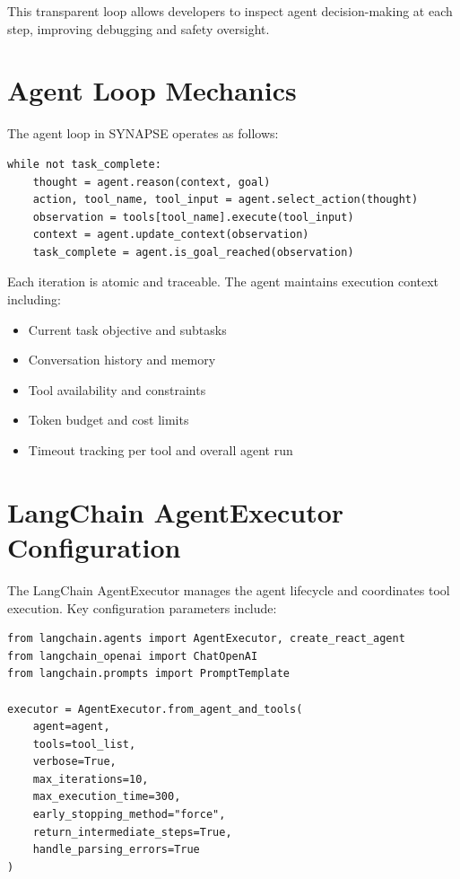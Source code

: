\documentclass{report}
\begin{document}
This transparent loop allows developers to inspect agent decision-making at each step, improving debugging and safety oversight.

\section{Agent Loop Mechanics}

The agent loop in SYNAPSE operates as follows:

\begin{lstlisting}
while not task_complete:
    thought = agent.reason(context, goal)
    action, tool_name, tool_input = agent.select_action(thought)
    observation = tools[tool_name].execute(tool_input)
    context = agent.update_context(observation)
    task_complete = agent.is_goal_reached(observation)
\end{lstlisting}

Each iteration is atomic and traceable. The agent maintains execution context including:

\begin{itemize}
    \item Current task objective and subtasks
    \item Conversation history and memory
    \item Tool availability and constraints
    \item Token budget and cost limits
    \item Timeout tracking per tool and overall agent run
\end{itemize}

\section{LangChain AgentExecutor Configuration}

The LangChain AgentExecutor manages the agent lifecycle and coordinates tool execution. Key configuration parameters include:

\begin{lstlisting}
from langchain.agents import AgentExecutor, create_react_agent
from langchain_openai import ChatOpenAI
from langchain.prompts import PromptTemplate

executor = AgentExecutor.from_agent_and_tools(
    agent=agent,
    tools=tool_list,
    verbose=True,
    max_iterations=10,
    max_execution_time=300,
    early_stopping_method="force",
    return_intermediate_steps=True,
    handle_parsing_errors=True
)
\end{lstlisting}
\end{document}
